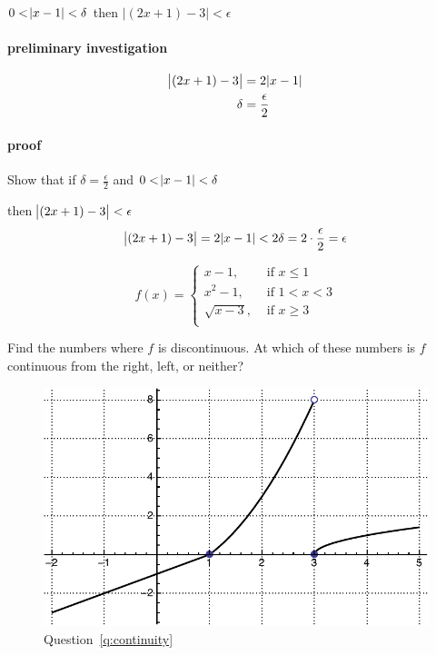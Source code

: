 \documentclass[letterpaper, landscape]{exam}
\begin{document}
\begin{questions}
\begin{solution}
        $0 < \envert{ x - 1 } < \delta$ then $|(2x + 1) - 3| < \epsilon$

        \paragraph{preliminary investigation}
        \begin{align*}
          \envert{ (2x + 1) - 3 } & = 2 \envert{ x - 1 } \\
          \delta         & = \frac{\epsilon}{2} \\
        \end{align*}

        \paragraph{proof}
        Show that if $\delta = \frac{\epsilon}{2}$ and $0 < \envert{ x - 1 } < \delta$

        then $ \envert{ (2x + 1) - 3 } < \epsilon$
        \[
          \envert{ (2x + 1) - 3 } = 2 \envert{ x - 1 } < 2 \delta = 2 \cdot \frac{\epsilon}{2} = \epsilon
        \]
        
      \end{solution}

    \ifprintanswers
      \newpage
    \fi

    \question[10]
    \label{q:continuity}
      \[
          f(x) =
            \begin{cases}
              x - 1,        & \text{ if } x \leq 1 \\
              x^2 - 1,      & \text{ if } 1 < x < 3 \\
              \sqrt{x - 3}, & \text{ if } x \geq 3 \\
            \end{cases}
      \]

      Find the numbers where $f$ is discontinuous. At which of these numbers is $f$
      continuous from the right, left, or neither?

      \begin{solution}
        \begin{figure}[H]
          \centering
          \includegraphics[scale = 0.5]{continuity.pdf}
          \caption{Question~\ref{q:continuity}}
          \label{fig:continuity}
        \end{figure}


\end{solution}
\end{questions}
\end{document}
